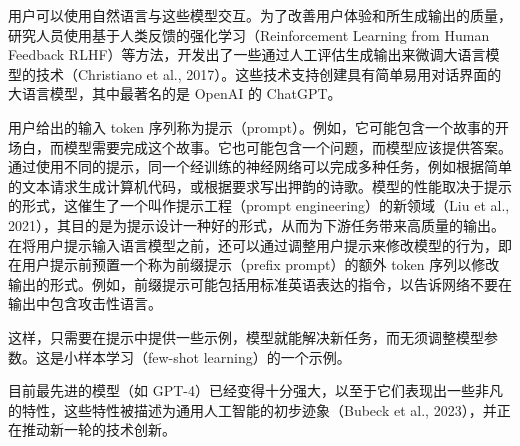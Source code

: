 \documentclass[../../main.tex]{subfiles}
\begin{document}
用户可以使用自然语言与这些模型交互。为了改善用户体验和所生成输出的质量，研究人员使用基于人类反馈的强化学习（Reinforcement Learning from Human Feedback RLHF）等方法，开发出了一些通过人工评估生成输出来微调大语言模型的技术（Christiano et al., 2017）。这些技术支持创建具有简单易用对话界面的大语言模型，其中最著名的是 OpenAI 的 ChatGPT。

用户给出的输入 token 序列称为提示（prompt）。例如，它可能包含一个故事的开场白，而模型需要完成这个故事。它也可能包含一个问题，而模型应该提供答案。通过使用不同的提示，同一个经训练的神经网络可以完成多种任务，例如根据简单的文本请求生成计算机代码，或根据要求写出押韵的诗歌。模型的性能取决于提示的形式，这催生了一个叫作提示工程（prompt engineering）的新领域（Liu et al., 2021），其目的是为提示设计一种好的形式，从而为下游任务带来高质量的输出。在将用户提示输入语言模型之前，还可以通过调整用户提示来修改模型的行为，即在用户提示前预置一个称为前缀提示（prefix prompt）的额外 token 序列以修改输出的形式。例如，前缀提示可能包括用标准英语表达的指令，以告诉网络不要在输出中包含攻击性语言。

这样，只需要在提示中提供一些示例，模型就能解决新任务，而无须调整模型参数。这是小样本学习（few-shot learning）的一个示例。

目前最先进的模型（如 GPT-4）已经变得十分强大，以至于它们表现出一些非凡的特性，这些特性被描述为通用人工智能的初步迹象（Bubeck et al., 2023），并正在推动新一轮的技术创新。
\end{document}
